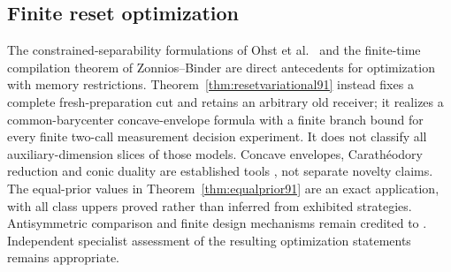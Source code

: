\subsection{Finite reset optimization}
The constrained-separability formulations of Ohst et al.\ \cite{OZNPQ89}
and the finite-time compilation theorem of Zonnios--Binder
\cite{ZB90} are direct antecedents for optimization with memory
restrictions.  Theorem~\ref{thm:resetvariational91} instead fixes a
complete fresh-preparation cut and retains an arbitrary old receiver;
it realizes a common-barycenter concave-envelope formula with a finite
branch bound for every finite two-call measurement decision experiment.
It does not classify all auxiliary-dimension slices of those models.
Concave envelopes, Carath\'eodory reduction and conic duality are
established tools \cite{Uhlmann91,BV91}, not separate novelty claims.
The equal-prior values in Theorem~\ref{thm:equalprior91} are an exact
application, with all class uppers proved rather than inferred from
exhibited strategies.  Antisymmetric comparison and finite design
mechanisms remain credited to \cite{ZHS90,GAE90}.  Independent specialist
assessment of the resulting optimization statements remains appropriate.
